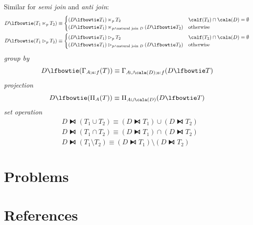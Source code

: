 \documentclass[11pt]{article}
\begin{document}
Similar for \emph{semi join} and \emph{anti join}:
\begin{align*}
&D\lfbowtie(T_1\ltimes_pT_2)\equiv
\begin{cases}
(D\lfbowtie T_1)\ltimes_pT_2&\calf(T_2)\cap\cala(D)=\emptyset\\
(D\lfbowtie T_1)\ltimes_{p\wedge\text{natural join }D}(D\lfbowtie T_2)&\text{otherwise}
\end{cases}\\
&D\lfbowtie(T_1\rhd_pT_2)\equiv
\begin{cases}
(D\lfbowtie T_1)\rhd_pT_2&\calf(T_2)\cap\cala(D)=\emptyset\\
(D\lfbowtie T_1)\rhd_{p\wedge\text{natural join }D}(D\lfbowtie T_2)&\text{otherwise}
\end{cases}
\end{align*}
\emph{group by}
\begin{equation*}
D\lfbowtie(\Gamma_{A;a:f}(T))\equiv\Gamma_{A\cup\cala(D);a:f}(D\lfbowtie T)
\end{equation*}
\emph{projection}
\begin{equation*}
D\lfbowtie(\Pi_A(T))\equiv\Pi_{A\cup\cala(D)}(D\lfbowtie T)
\end{equation*}
\emph{set operation}
\begin{align*}
&D\lfbowtie(T_1\cup T_2)\equiv(D\lfbowtie T_1)\cup(D\lfbowtie T_2)\\
&D\lfbowtie(T_1\cap T_2)\equiv(D\lfbowtie T_1)\cap(D\lfbowtie T_2)\\
&D\lfbowtie(T_1\setminus T_2)\equiv(D\lfbowtie T_1)\setminus(D\lfbowtie T_2)
\end{align*}
\section{Problems}
\label{sec:org273725f}


\section{References}
\label{sec:org5a66ca9}
\label{bibliographystyle link}


\label{bibliography link}

\end{document}
